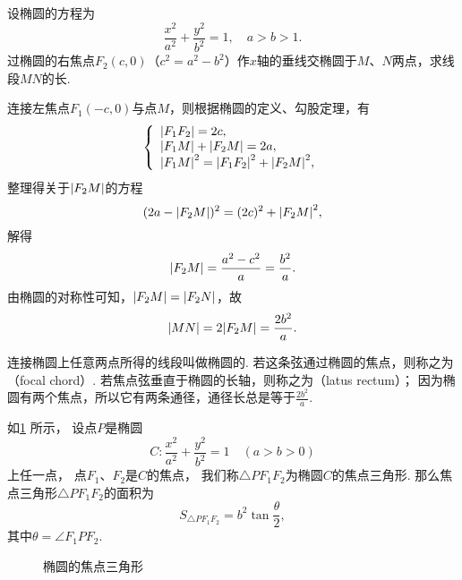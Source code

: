 \begin{example}
设椭圆的方程为\[
\frac{x^2}{a^2}+\frac{y^2}{b^2}=1, \quad a>b>1.
\]过椭圆的右焦点\(F_2(c,0)\)（\(c^2=a^2-b^2\)）作\(x\)轴的垂线交椭圆于\(M\)、\(N\)两点，求线段\(MN\)的长.
\begin{solution}
连接左焦点\(F_1(-c,0)\)与点\(M\)，则根据椭圆的定义、勾股定理，有\[
\left\{ \begin{array}{l}
\abs{F_1 F_2} = 2c, \\
\abs{F_1 M} + \abs{F_2 M} = 2a, \\
\abs{F_1 M}^2 = \abs{F_1 F_2}^2 + \abs{F_2 M}^2,
\end{array} \right.
\]整理得关于\(\abs{F_2 M}\)的方程\[
(2a - \abs{F_2 M})^2 = (2c)^2 + \abs{F_2 M}^2,
\]解得\[
\abs{F_2 M} = \frac{a^2 - c^2}{a} = \frac{b^2}{a}.
\]由椭圆的对称性可知，\(\abs{F_2 M} = \abs{F_2 N}\)，故\[
\abs{MN} = 2\abs{F_2 M} = \frac{2 b^2}{a}.
\]
\end{solution}

连接椭圆上任意两点所得的线段叫做椭圆的.
若这条弦通过椭圆的焦点，则称之为（focal chord）.
若焦点弦垂直于椭圆的长轴，则称之为（latus rectum）；
因为椭圆有两个焦点，所以它有两条通径，通径长总是等于\(\frac{2b^2}{a}\).
\end{example}

\begin{theorem}[椭圆的焦点三角形]
如\cref{figure:解析几何.椭圆的焦点三角形} 所示，%
设点\(P\)是椭圆\[
	C: \frac{x^2}{a^2} + \frac{y^2}{b^2} = 1
	\quad(a>b>0)
\]上任一点，%
点\(F_1\)、\(F_2\)是\(C\)的焦点，
我们称\(\triangle P F_1 F_2\)为椭圆\(C\)的焦点三角形.
那么焦点三角形\(\triangle P F_1 F_2\)的面积为\[
S_{\triangle P F_1 F_2} = b^2 \tan\frac{\theta}{2},
\]其中\(\theta=\angle{F_1 P F_2}\).

\begin{figure}[ht]
\centering
{}
\caption{椭圆的焦点三角形}
\label{figure:解析几何.椭圆的焦点三角形}
\end{figure}
\end{theorem}

